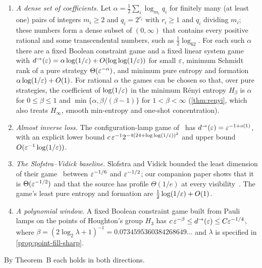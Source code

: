 \begin{theoremC}
\leavevmode
\begin{enumerate}[label=(\roman*),itemsep=2pt]
\item \emph{A dense set of coefficients.} Let $\alpha=\frac12\sum_i\log_{m_i}q_i$ for finitely many (at least one) pairs of integers $m_i\ge2$ and
$q_i=2^{r_i}$ with $r_i\ge1$ and $q_i$ dividing $m_i$; these numbers form a dense subset of $(0,\infty)$ that contains every positive rational and some transcendental numbers, such
as $\frac12\log_62$. For each such $\alpha$ there are a fixed Boolean constraint game and a fixed linear system game with
$d^\to(\varepsilon)=\alpha\log(1/\varepsilon)+O(\log\log(1/\varepsilon))$ for small $\varepsilon$, minimum Schmidt rank of a pure strategy $\Theta(\varepsilon^{-\alpha})$, and
minimum pure entropy and formation $\alpha\log(1/\varepsilon)+O(1)$. For rational $\alpha$ the games can be chosen so that, over pure
strategies, the coefficient of $\log(1/\varepsilon)$ in the minimum R\'enyi entropy $H_\beta$ is $\alpha$ for $0\le\beta\le1$ and
$\min\{\alpha,\beta/(\beta-1)\}$ for $1<\beta<\infty$ (\cref{thm:renyi}, which also treats $H_\infty$, smooth min-entropy and
one-shot concentration).
\item \emph{Almost inverse loss.} The configuration-lamp game of~\cite{DM-game} has $d^\to(\varepsilon)=\varepsilon^{-1+o(1)}$, with an explicit
lower bound $c\,\varepsilon^{-1}2^{-4(24+\log\log(1/\varepsilon))^2}$ and upper bound $O(\varepsilon^{-1}\log(1/\varepsilon))$.
\item \emph{The Slofstra--Vidick baseline.} Slofstra and Vidick bounded the least dimension of their game~\cite{SV18} between
$\varepsilon^{-1/6}$ and $\varepsilon^{-1/2}$; our companion paper shows that it is $\Theta(\varepsilon^{-1/2})$ and that the source has profile
$\Theta(1/e)$ at every visibility~\cite[Theorem~F]{DM-game}. The game's least pure entropy and formation are
$\frac12\log(1/\varepsilon)+O(1)$.
\item \emph{A polynomial window.} A fixed Boolean constraint game built from Pauli lamps on the points of Houghton's group $H_3$ has
$c\,\varepsilon^{-\beta}\le d^\to(\varepsilon)\le C\varepsilon^{-1/4}$, where $\beta=(2\log_2\lambda+1)^{-1}=0.0734595360384268649\ldots$ and $\lambda$ is specified in \cref{prop:point-fill-sharp}.
\end{enumerate}
By Theorem~B each holds in both directions.
\end{theoremC}

